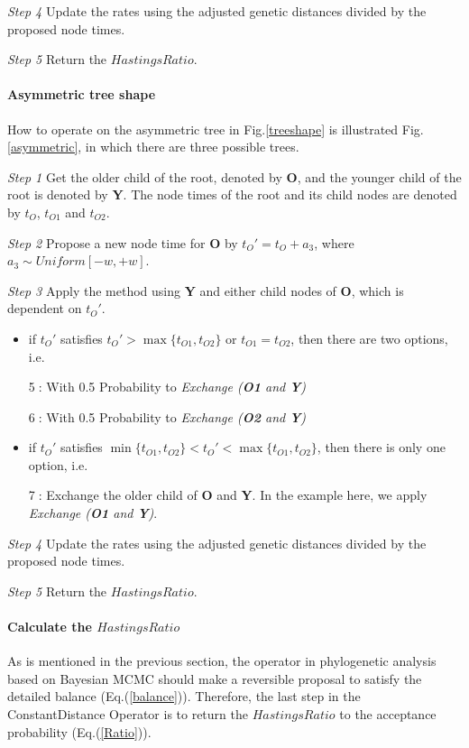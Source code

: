 \documentclass{bmcart}
\begin{document}
\emph{Step 4}  Update the rates using the adjusted genetic distances divided by the proposed node times.

\emph{Step 5} Return the $HastingsRatio$.
\paragraph*{Asymmetric tree shape}

How to operate on the asymmetric tree in Fig.\ref{treeshape} is illustrated Fig.\ref{asymmetric}, in which there are three possible trees.

\emph{Step 1} Get the older child of the root, denoted by \textbf{O}, and the younger child of the root is denoted by \textbf{Y}. The node times of the root and its child nodes are denoted by ${t_O}$, ${t_{O1}}$ and ${t_{O2}}$.

\emph{Step 2} Propose a new node time for \textbf{O} by ${t_O}' = {t_O} + {a_3}$, where ${a_3} \sim Uniform[ - w, + w]$.

\emph{Step 3} Apply the method using \textbf{Y} and either child nodes of \textbf{O}, which is dependent on ${t_O}'$.
\begin{itemize}
\item if ${t_O}'$ satisfies ${t_O}' > \max \{ {t_{O1}},{t_{O2}}\} $ or ${t_{O1}} = {t_{O2}}$, then there are two options, i.e.

\textcircled5: With 0.5 Probability to \textit{Exchange (\textbf{O1} and \textbf{Y})}

\textcircled6: With 0.5 Probability to \textit{Exchange (\textbf{O2} and \textbf{Y})}
\item if ${t_O}'$ satisfies $\min \{ {t_{O1}},{t_{O2}}\}  < {t_O}' < \max \{ {t_{O1}},{t_{O2}}\} $, then there is only one option, i.e.

\textcircled7: Exchange the older child of \textbf{O} and \textbf{Y}.  In the example here, we apply \textit{Exchange (\textbf{O1}  and \textbf{Y})}.
\end{itemize}

\emph{Step 4}  Update the rates using the adjusted genetic distances divided by the proposed node times.

\emph{Step 5} Return the $HastingsRatio$.

\paragraph*{Calculate the $HastingsRatio$}

As is mentioned in the previous section, the operator in phylogenetic analysis based on Bayesian MCMC should make a reversible proposal to satisfy the detailed balance (Eq.(\ref{balance})). Therefore, the last step in the ConstantDistance Operator is to return the $HastingsRatio$ to the acceptance probability (Eq.(\ref{Ratio})). 
\end{document}
